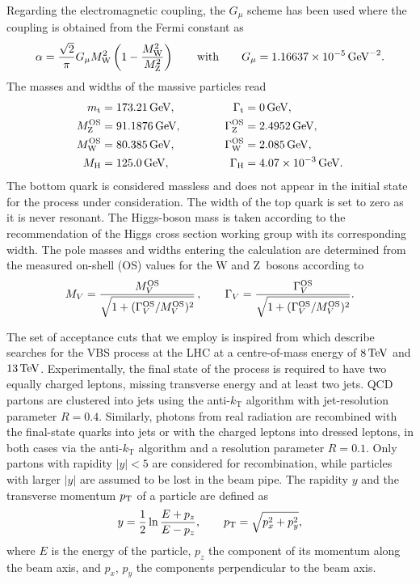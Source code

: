 \documentclass[a4article,11pt]{article}
\begin{document}
Regarding the electromagnetic coupling, the $G_\mu$ scheme \cite{Denner:2000bj} has been used where the coupling is obtained from the Fermi constant as
%
\begin{equation}
  \alpha = \frac{\sqrt{2}}{\pi} G_\mu \MW^2 \left( 1 - \frac{\MW^2}{\MZ^2} \right)  \qquad \text{with}  \qquad   {\GF    = 1.16637\times 10^{-5}\GeV^{-2}}.
\end{equation}
%
The masses and widths of the massive particles read \cite{Agashe:2014kda}
% 
\begin{alignat}{2}
\label{eqn:ParticleMassesAndWidths}
                  m_\text{t}   &=  173.21\,\text{GeV},       & \quad \quad \quad \Gamma_\text{t} &= 0 \,\text{GeV},  \nonumber \\
                M_\text{Z}^\text{OS} &=  91.1876\,\text{GeV},      & \quad \quad \quad \Gamma_\text{Z}^\text{OS} &= 2.4952\,\text{GeV},  \nonumber \\
                M_\text{W}^\text{OS} &=  80.385\,\text{GeV},       & \Gamma_\text{W}^\text{OS} &= 2.085\,\text{GeV},  \nonumber \\
                M_{\rm H} &=  125.0\,\text{GeV},       &  \Gamma_\text{H}   &=  4.07 \times 10^{-3}\,\text{GeV}.
\end{alignat}
%
The bottom quark is considered massless and does not appear in the initial state for the process under consideration.
The width of the top quark is set to zero as it is never resonant.
The Higgs-boson mass is taken according to the recommendation of the Higgs cross section working group \cite{Heinemeyer:2013tqa} with its corresponding width.
The pole masses and widths entering the calculation are determined
from the measured on-shell (OS) values \cite{Bardin:1988xt} for the W and Z~bosons according to
%
\begin{equation}
        M_V = \frac{M_V^\text{OS}}{\sqrt{1+(\Gamma_V^\text{OS}/M_V^\text{OS})^2}}\,,\qquad  
\Gamma_V = \frac{\Gamma_V^\text{OS}}{\sqrt{1+(\Gamma_V^\text{OS}/M_V^\text{OS})^2}}.
\end{equation}

The set of acceptance cuts that we employ is inspired from
 which describe
searches for the VBS process at the LHC at a centre-of-mass energy of
$8\,\text{TeV}$ and $13\,\text{TeV}$.
Experimentally, the final state of the process is required to have two
equally charged leptons, missing transverse energy and at least two
jets. QCD partons are clustered into jets using the anti-$k_\text{T}$
algorithm \cite{Cacciari:2008gp} with jet-resolution parameter
$R=0.4$.  Similarly, photons from real radiation are recombined with
the final-state quarks into jets or with the charged leptons into
dressed leptons, in both cases via the anti-$k_\text{T}$ algorithm and
a resolution parameter $R=0.1$.  Only partons with rapidity $|y|<5$
are considered for recombination, while particles with larger $|y|$ are
assumed to be lost in the beam pipe.  The rapidity $y$ and the
transverse momentum $p_{\rm T}$ of a particle are defined as
\begin{align}
y=\frac{1}{2}\ln \frac{E+p_z}{E-p_z}, \qquad
p_{\rm T} = \sqrt{p_x^2+p_y^2},
\end{align}
where $E$ is the energy of the particle, $p_z$ the component of its
momentum along the beam axis, and $p_x$, $p_y$ the components
perpendicular to the beam axis.  
\end{document}
